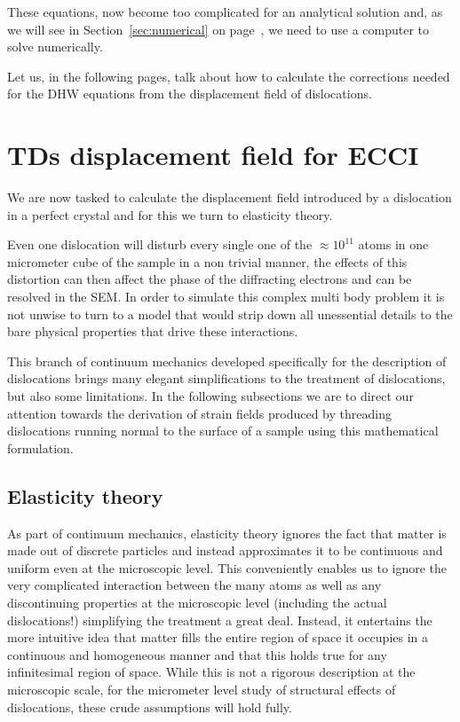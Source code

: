 These equations, now become too complicated for an analytical solution and, as we will see in Section~\ref{sec:numerical} on page~\pageref{sec:numerical},  we need to use a computer to solve numerically. 

Let us, in the following pages, talk about how to calculate the corrections needed for the DHW equations from the displacement field of dislocations. 


 \section{TDs displacement field for ECCI}
 \label{sec:strain}


We are now tasked to calculate the displacement field introduced by a dislocation in a perfect crystal and for this we turn to elasticity theory. 

Even one dislocation will disturb every single one of the $\approx 10^{11}$ atoms in one micrometer cube of the sample in a non trivial manner, the effects of this distortion can then affect the phase of the diffracting electrons and can be resolved in the SEM. In order to simulate this complex multi body problem it is not unwise to turn to a model that would strip down all unessential details to the bare physical properties that drive these interactions.

This branch of continuum mechanics developed specifically for the description of dislocations brings many elegant simplifications to the treatment of dislocations, but also some limitations. In the following subsections we are to direct our attention towards the derivation of strain fields produced by threading dislocations running normal to the surface of a sample using this mathematical formulation.

\subsection{Elasticity theory}
 As part of continuum mechanics, elasticity theory ignores the fact that matter is made out of discrete particles and instead approximates it to be continuous and uniform even at the microscopic level. This conveniently enables us to ignore the very complicated interaction between the many atoms as well as any discontinuing properties at the microscopic level (including the actual dislocations!) simplifying the treatment a great deal. Instead, it entertains the more intuitive idea that matter fills the entire region of space it occupies in a continuous and homogeneous manner and that this holds true for any infinitesimal region of space. While this is not a rigorous description at the microscopic scale, for the micrometer level study of structural effects of dislocations, these crude assumptions will hold fully.

